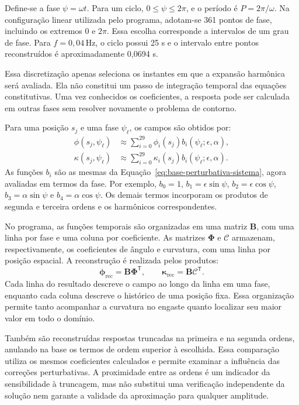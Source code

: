 \documentclass[arial,centeredequations,english,brazilian,oneside,section=TITLE]{ifes8}
\begin{document}
Define-se a fase $\psi=\omega t$. Para um ciclo, $0\leq\psi\leq2\pi$, e
o período é $P=2\pi/\omega$. Na configuração linear utilizada pelo programa,
adotam-se 361 pontos de fase, incluindo os extremos 0 e $2\pi$. Essa escolha
corresponde a intervalos de um grau de fase. Para $f=0{,}04\,\mathrm{Hz}$,
o ciclo possui 25 s e o intervalo entre pontos reconstruídos é aproximadamente
0,0694 s.

Essa discretização apenas seleciona os instantes em que a expansão harmônica
será avaliada. Ela não constitui um passo de integração temporal das equações
constitutivas. Uma vez conhecidos os coeficientes, a resposta pode ser
calculada em outras fases sem resolver novamente o problema de contorno.

Para uma posição $s_j$ e uma fase $\psi_\ell$, os campos são obtidos por:
\begin{align}
  \phi(s_j,\psi_\ell)&\approx
    \sum_{i=0}^{29}\phi_i(s_j)b_i(\psi_\ell;\epsilon,\alpha),
    \label{eq:reconstrucao-angulo-linear}\\
  \kappa(s_j,\psi_\ell)&\approx
    \sum_{i=0}^{29}\kappa_i(s_j)b_i(\psi_\ell;\epsilon,\alpha).
    \label{eq:reconstrucao-curvatura-linear}
\end{align}
As funções $b_i$ são as mesmas da
Equação~\eqref{eq:base-perturbativa-sistema}, agora avaliadas em termos da
fase. Por exemplo, $b_0=1$, $b_1=\epsilon\sin\psi$,
$b_2=\epsilon\cos\psi$, $b_3=\alpha\sin\psi$ e
$b_4=\alpha\cos\psi$. Os demais termos incorporam os produtos de segunda
e terceira ordens e os harmônicos correspondentes.

No programa, as funções temporais são organizadas em uma matriz
$\mathbf B$, com uma linha por fase e uma coluna por coeficiente. As matrizes
$\boldsymbol\Phi$ e $\boldsymbol{\mathcal C}$ armazenam, respectivamente,
os coeficientes de ângulo e curvatura, com uma linha por posição espacial.
A reconstrução é realizada pelos produtos:
\begin{equation}
  \boldsymbol\phi_{\mathrm{rec}}=\mathbf B\boldsymbol\Phi^{\mathsf T},
  \qquad
  \boldsymbol\kappa_{\mathrm{rec}}=\mathbf B\boldsymbol{\mathcal C}^{\mathsf T}.
  \label{eq:reconstrucao-matricial-linear}
\end{equation}
Cada linha do resultado descreve o campo ao longo da linha em uma fase,
enquanto cada coluna descreve o histórico de uma posição fixa. Essa organização
permite tanto acompanhar a curvatura no engaste quanto localizar seu maior
valor em todo o domínio.

Também são reconstruídas respostas truncadas na primeira e na segunda ordens,
anulando na base os termos de ordem superior à escolhida. Essa comparação
utiliza os mesmos coeficientes calculados e permite examinar a influência
das correções perturbativas. A proximidade entre as ordens é um indicador
da sensibilidade à truncagem, mas não substitui uma verificação independente
da solução nem garante a validade da aproximação para qualquer amplitude.
\end{document}
